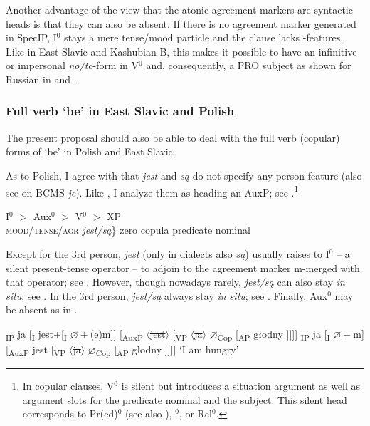 \documentclass[output=paper]{langscibook}
\begin{document}
Another advantage of the view that the atonic agreement markers are syntactic heads is that they can also be absent. If there is no agreement marker generated in SpecIP, I$^0$ stays a mere tense/mood particle and the clause lacks \textphi-features. Like in East Slavic and Kashubian-B, this makes it possible to have an infinitive or impersonal \textit{no/to}-form in V$^0$ and, consequently, a PRO subject as shown for Russian in  and .


\subsubsection{Full verb `be' in East Slavic and Polish}\label{pitsch:sec:FullVerbs}

The present proposal should also be able to deal with the full verb (copular) forms of `be' in Polish and East Slavic.

As to Polish, I agree with \citet{Migdalski2006} that \textit{jest} and \textit{są} do not specify any person feature (also see \citealt{Tomic1996} on BCMS \textit{je}). Like \citet[275]{Migdalski2006}, I analyze them as heading an AuxP; see .\footnote{In copular clauses, V$^0$ is silent but introduces a situation argument as well as argument slots for the predicate nominal and the subject. This silent head corresponds to  Pr(ed)$^0$ (see also \citealt{Bailyn2001,Bailyn2012, Markman2008Case}),  \textpi$^0$, or  Rel$^0$.}

\ea
\gll I$^0$ $>$ {} Aux$^0$ $>$ V$^0$ $>$ XP \\
\textsc{mood/tense/agr} {} \minsp{\{} \textit{jest/są}\} {} {zero copula} {} {predicate nominal} \\
\label{pitsch:ex:CopPol}
\z

\noindent Except for the 3rd person, \textit{jest} (only in dialects also \textit{są}) usually raises to I$^0$ -- a silent present-tense operator -- to adjoin to the agreement marker m-merged with that operator; see . However, though nowadays rarely, \textit{jest/są} can also stay \textit{in situ}; see . In the 3rd person, \textit{jest/są} always stay \textit{in situ}; see . Finally, Aux$^0$ may be absent as in .

\ea 
\ea {[}\textsubscript{IP} ja [\textsubscript{I} jest+[\textsubscript{I} $\varnothing+$(e)m]] [\textsubscript{AuxP} $\langle$\sout{jest}$\rangle$ [\textsubscript{VP} $\langle$\sout{ja}$\rangle$ $\varnothing$\textsubscript{Cop} [\textsubscript{AP} głodny ]]]] \label{pitsch:ex:CopPol_a} 
\ex {[}\textsubscript{IP} ja [\textsubscript{I} $\varnothing+$m] [\textsubscript{AuxP} jest [\textsubscript{VP} $\langle$\sout{ja}$\rangle$ $\varnothing$\textsubscript{Cop} [\textsubscript{AP} głodny ]]]] \label{pitsch:ex:CopPol_b}
\z
`I am hungry'
\z
\end{document}
